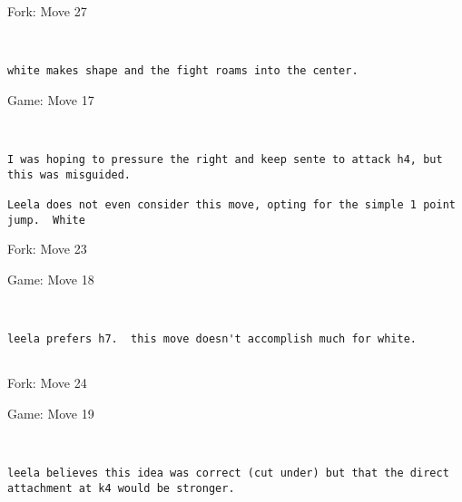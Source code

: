 \documentclass{article}
\begin{document}
\begin{subsection}{Fork: Move 27}
\begin{center}
\cleargoban
{}
\showfullgoban
\\\begin{lstlisting}
white makes shape and the fight roams into the center. 
\end{lstlisting}
\end{center}
\end{subsection}
\newpage
\begin{section}{Game: Move 17}
\begin{center}
\cleargoban
{}
\showfullgoban
\\\begin{lstlisting}
I was hoping to pressure the right and keep sente to attack h4, but this was misguided.  

Leela does not even consider this move, opting for the simple 1 point jump.  White 
\end{lstlisting}
\end{center}
\end{section}
\begin{subsection}{Fork: Move 23}
\end{subsection}
\newpage
\begin{section}{Game: Move 18}
\begin{center}
\cleargoban
{}
\showfullgoban
\\\begin{lstlisting}
leela prefers h7.  this move doesn't accomplish much for white.


\end{lstlisting}
\end{center}
\end{section}
\begin{subsection}{Fork: Move 24}
\end{subsection}
\newpage
\begin{section}{Game: Move 19}
\begin{center}
\cleargoban
{}
\showfullgoban
\\\begin{lstlisting}
leela believes this idea was correct (cut under) but that the direct attachment at k4 would be stronger. 
\end{lstlisting}
\end{center}
\end{section}
\end{document}

